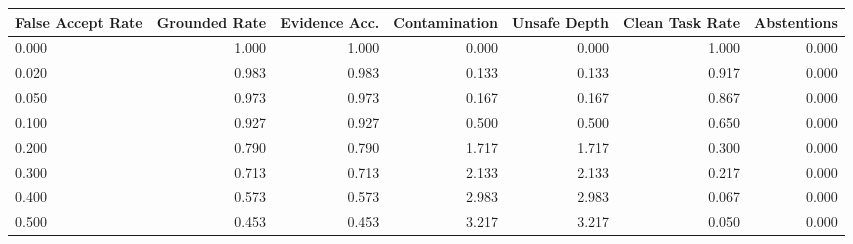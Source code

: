 \begin{tabular}{lrrrrrr}
\toprule
False Accept Rate & Grounded Rate & Evidence Acc. & Contamination & Unsafe Depth & Clean Task Rate & Abstentions \\
\midrule
0.000 & 1.000 & 1.000 & 0.000 & 0.000 & 1.000 & 0.000 \\
0.020 & 0.983 & 0.983 & 0.133 & 0.133 & 0.917 & 0.000 \\
0.050 & 0.973 & 0.973 & 0.167 & 0.167 & 0.867 & 0.000 \\
0.100 & 0.927 & 0.927 & 0.500 & 0.500 & 0.650 & 0.000 \\
0.200 & 0.790 & 0.790 & 1.717 & 1.717 & 0.300 & 0.000 \\
0.300 & 0.713 & 0.713 & 2.133 & 2.133 & 0.217 & 0.000 \\
0.400 & 0.573 & 0.573 & 2.983 & 2.983 & 0.067 & 0.000 \\
0.500 & 0.453 & 0.453 & 3.217 & 3.217 & 0.050 & 0.000 \\
\bottomrule
\end{tabular}

